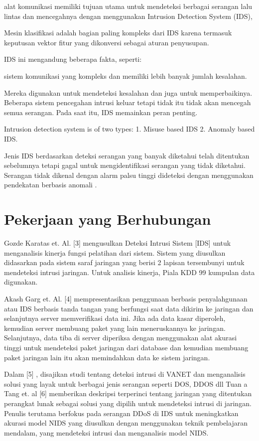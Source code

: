 \documentclass[conference]{IEEEtran}
\begin{document}
    alat komunikasi memiliki tujuan utama untuk mendeteksi berbagai serangan lalu lintas dan mencegahnya dengan menggunakan Intrusion Detection System (IDS),
    
    Mesin klasifikasi adalah bagian paling kompleks dari IDS karena termasuk keputusan vektor fitur yang dikonversi sebagai aturan penyusupan.
    
     IDS ini mengandung beberapa fakta, seperti:
     
     sistem komunikasi yang kompleks dan memiliki lebih banyak jumlah kesalahan.
     
     Mereka digunakan untuk mendeteksi kesalahan dan juga untuk memperbaikinya. Beberapa sistem pencegahan intrusi keluar tetapi tidak itu tidak akan mencegah semua serangan. Pada saat itu, IDS memainkan peran penting.
     
     Intrusion detection system is of two types: 1. Misuse based IDS 2. Anomaly based IDS.
     
     Jenis IDS berdasarkan deteksi serangan yang banyak diketahui telah ditentukan sebelumnya tetapi gagal untuk mengidentifikasi serangan yang tidak diketahui. Serangan tidak dikenal dengan alarm palsu tinggi dideteksi dengan menggunakan pendekatan berbasis anomali \cite{aydin2009hybrid}.
     
\section{Pekerjaan yang Berhubungan}
    Gozde Karatas et. Al. [3] \cite {karatas2018neural} mengusulkan Deteksi Intrusi Sistem [IDS] untuk menganalisis kinerja fungsi pelatihan dari sistem. Sistem yang diusulkan didasarkan pada sistem saraf jaringan yang berisi 2 lapisan tersembunyi untuk mendeteksi intrusi jaringan. Untuk analisis kinerja, Piala KDD 99 kumpulan data digunakan.
    
    Akash Garg et. Al. [4] \cite {garg2016hybrid} mempresentasikan penggunaan berbasis penyalahgunaan atau IDS berbasis tanda tangan yang berfungsi saat data dikirim ke jaringan dan selanjutnya server memverifikasi data ini. Jika ada data kasar diperoleh, kemudian server membuang paket yang lain meneruskannya ke jaringan. Selanjutnya, data tiba di server diperiksa dengan menggunakan alat akurasi tinggi untuk mendeteksi paket jaringan dari database dan kemudian membuang paket jaringan lain itu akan memindahkan data ke sistem jaringan.
    
    Dalam [5] \cite {gonccalves2019systematic}, disajikan studi tentang deteksi intrusi di VANET dan menganalisis solusi yang layak untuk berbagai jenis serangan seperti DOS, DDOS dll Tuan a Tang et. al [6] \cite{tang2016deep} memberikan deskripsi terperinci tentang jaringan yang ditentukan perangkat lunak sebagai solusi yang dipilih untuk mendeteksi intrusi di jaringan. Penulis terutama berfokus pada serangan DDoS di IDS untuk meningkatkan akurasi model NIDS yang diusulkan dengan menggunakan teknik pembelajaran mendalam, yang mendeteksi intrusi dan menganalisis model NIDS.
\end{document}
